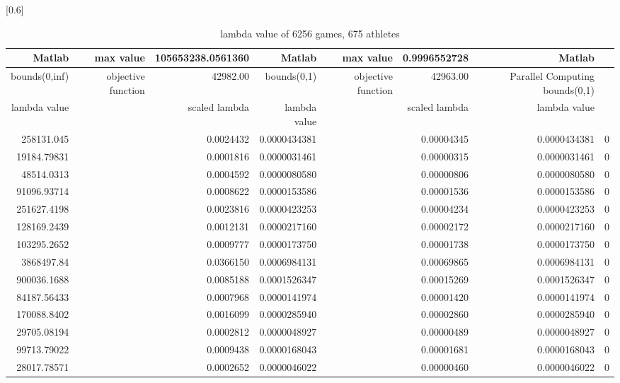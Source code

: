\documentclass[
journal=jacsat, %
manuscript=article]{achemso}
\begin{document}
\begin{table}[htbp]
  \centering
  \caption{lambda value of 6256 games, 675 athletes}
  \scalebox{0.6}[0.6]{%
    \begin{tabular}{rrrrrrrr}
    \toprule
        Matlab & max value & 105653238.0561360 & Matlab & max value & 0.9996552728 & Matlab \\
    \hline
    bounds(0,inf) & objective function & 42982.00 & bounds(0,1) & objective function & 42963.00 &  Parallel Computing bounds(0,1) \\
    \hline
    lambda value &       & scaled lambda & lambda value  &       & scaled lambda & lambda value  \\
    \bottomrule
    258131.045 &       & 0.0024432 & 0.0000434381 &       & 0.00004345 & 0.0000434381 & 0 \\
    19184.79831 &       & 0.0001816 & 0.0000031461 &       & 0.00000315 & 0.0000031461 & 0 \\
    48514.0313 &       & 0.0004592 & 0.0000080580 &       & 0.00000806 & 0.0000080580 & 0 \\
    91096.93714 &       & 0.0008622 & 0.0000153586 &       & 0.00001536 & 0.0000153586 & 0 \\
    251627.4198 &       & 0.0023816 & 0.0000423253 &       & 0.00004234 & 0.0000423253 & 0 \\
    128169.2439 &       & 0.0012131 & 0.0000217160 &       & 0.00002172 & 0.0000217160 & 0 \\
    103295.2652 &       & 0.0009777 & 0.0000173750 &       & 0.00001738 & 0.0000173750 & 0 \\
    3868497.84 &       & 0.0366150 & 0.0006984131 &       & 0.00069865 & 0.0006984131 & 0 \\
    900036.1688 &       & 0.0085188 & 0.0001526347 &       & 0.00015269 & 0.0001526347 & 0 \\
    84187.56433 &       & 0.0007968 & 0.0000141974 &       & 0.00001420 & 0.0000141974 & 0 \\
    170088.8402 &       & 0.0016099 & 0.0000285940 &       & 0.00002860 & 0.0000285940 & 0 \\
    29705.08194 &       & 0.0002812 & 0.0000048927 &       & 0.00000489 & 0.0000048927 & 0 \\
    99713.79022 &       & 0.0009438 & 0.0000168043 &       & 0.00001681 & 0.0000168043 & 0 \\
    28017.78571 &       & 0.0002652 & 0.0000046022 &       & 0.00000460 & 0.0000046022 & 0 \\

\end{tabular}}
\end{table}
\end{document}
